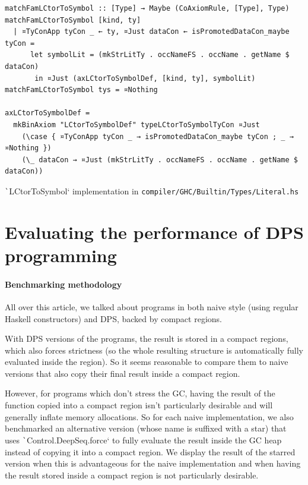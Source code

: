 \documentclass[english]{jflart}
\begin{document}
\begin{table}[p]
\small
\begin{verbatim}
matchFamLCtorToSymbol :: [Type] → Maybe (CoAxiomRule, [Type], Type)
matchFamLCtorToSymbol [kind, ty]
  | ¤TyConApp tyCon _ ← ty, ¤Just dataCon ← isPromotedDataCon_maybe tyCon =
      let symbolLit = (mkStrLitTy . occNameFS . occName . getName $ dataCon)
       in ¤Just (axLCtorToSymbolDef, [kind, ty], symbolLit)
matchFamLCtorToSymbol tys = ¤Nothing

axLCtorToSymbolDef =
  mkBinAxiom "LCtorToSymbolDef" typeLCtorToSymbolTyCon ¤Just
    (\case { ¤TyConApp tyCon _ → isPromotedDataCon_maybe tyCon ; _ → ¤Nothing })
    (\_ dataCon → ¤Just (mkStrLitTy . occNameFS . occName . getName $ dataCon))
\end{verbatim}
\caption{\texttt`LCtorToSymbol` implementation in \texttt{compiler/GHC/Builtin/Types/Literal.hs}}
\label{table:impl-LCtorToSymbol}
\end{table}

\section{Evaluating the performance of DPS programming}\label{sec:benchmark}

\paragraph{Benchmarking methodology}

All over this article, we talked about programs in both naive style (using regular Haskell constructors) and DPS, backed by compact regions.

With DPS versions of the programs, the result is stored in a compact regions, which also forces strictness (so the whole resulting structure is automatically fully evaluated inside the region). So it seems reasonable to compare them to naive versions that also copy their final result inside a compact region.

However, for programs which don't stress the GC, having the result of the function copied into a compact region isn't particularly desirable and will generally inflate memory allocations. So for each naive implementation, we also benchmarked an alternative version (whose name is suffixed with a star) that uses \texttt`Control.DeepSeq.force` to fully evaluate the result inside the GC heap instead of copying it into a compact region. We display the result of the starred version when this is advantageous for the naive implementation and when having the result stored inside a compact region is not particularly desirable.
\end{document}

